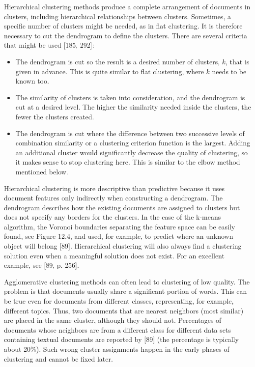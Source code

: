 \documentclass[11pt,openany,executivepaper]{book}
\begin{document}
\indent Hierarchical clustering methods produce a complete arrangement of documents in clusters, including hierarchical relationships between clusters. Sometimes, a specific number of clusters might be needed, as in flat clustering. It is therefore necessary to cut the dendrogram to define the clusters. There are several criteria that might be used [185, 292]:

\begin{itemize}
    \item The dendrogram is cut so the result is a desired number of clusters, $k$, that is given in advance. This is quite similar to flat clustering, where $k$ needs to be known too.

    \item The similarity of clusters is taken into consideration, and the dendrogram is cut at a desired level. The higher the similarity needed inside the clusters, the fewer the clusters created.

    \item The dendrogram is cut where the difference between two successive levels of combination similarity or a clustering criterion function is the largest. Adding an additional cluster would significantly decrease the quality of clustering, so it makes sense to stop clustering here. This is similar to the elbow method mentioned below.
\end{itemize}

\indent Hierarchical clustering is more descriptive than predictive because it uses document features only indirectly when constructing a dendrogram. The dendrogram describes how the existing documents are assigned to clusters but does not specify any borders for the clusters. In the case of the k-means algorithm, the Voronoi boundaries separating the feature space can be easily found, see Figure 12.4, and used, for example, to predict where an unknown object will belong [89].
Hierarchical clustering will also always find a clustering solution even when a meaningful solution does not exist. For an excellent example, see [89, p. 256].

\indent Agglomerative clustering methods can often lead to clustering of low quality. The problem is that documents usually share a significant portion of words. This can be true even for documents from different classes, representing, for example, different topics. Thus, two documents that are nearest neighbors (most similar) are placed in the same cluster, although they should not. Percentages of documents whose neighbors are from a different class for different data sets containing textual documents are reported by [89] (the percentage is typically about 20\%). Such wrong cluster assignments happen in the early phases of clustering and cannot be fixed later.
\end{document}
